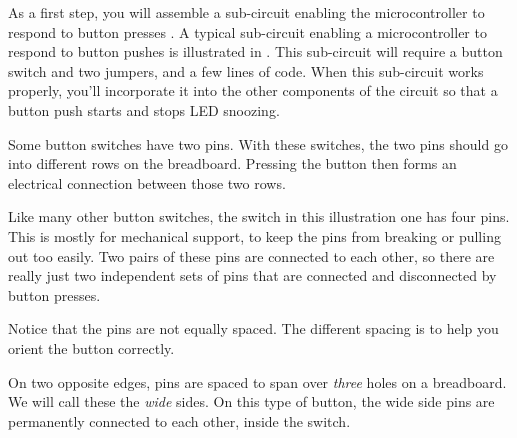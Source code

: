 As a first step, you will assemble a sub-circuit enabling the microcontroller to respond to button presses
. A typical sub-circuit enabling a microcontroller to respond to button pushes is illustrated in .
This sub-circuit will require a button switch and two jumpers, and a few lines of code.
When this sub-circuit works properly, you'll incorporate it into the other components of the circuit so that a button push starts and stops LED snoozing.

Some button switches have two pins.
With these switches, the two pins should go into different rows on the breadboard.
Pressing the button then forms an electrical connection between those two rows.

Like many other button switches, the switch in this illustration one has four pins.
This is mostly for mechanical support, to keep the pins from breaking or pulling out too easily.
Two pairs of these pins are connected to each other, so there are really just two independent sets of pins that are connected and disconnected by button presses.

Notice that the pins are not equally spaced.
The different spacing is to help you orient the button correctly.

On two opposite edges, pins are spaced to span over \emph{three} holes on a breadboard.
We will call these the \emph{wide} sides.
On this type of button, the wide side pins are permanently connected to each other, inside the switch. 

